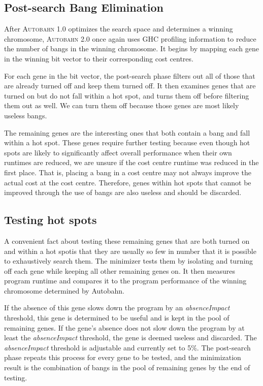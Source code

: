\documentclass[format=sigplan, review=true]{acmart}
\newcommand{\hotspot}[0]{hot spot}
\newcommand{\hotspots}[0]{hot spots}
\newcommand{\useless}[0]{useless}
\newcommand{\Ao}[0]{\textsc{Autobahn 1.0}}
\newcommand{\At}[0]{\textsc{Autobahn 2.0}}
\newcommand{\postopt}[0]{post-search}
\newcommand{\Postopt}[0]{Post-search}
\newcommand{\absim}[0]{\textit{absenceImpact}}
\begin{document}
\subsection{\Postopt{} Bang Elimination}

After \Ao{} optimizes the search space and determines a winning chromosome, \At{} once again uses GHC profiling information to reduce the number of bangs in the winning chromosome. It begins by mapping each gene in the winning bit vector to their corresponding cost centres. 

For each gene in the bit vector, the \postopt{} phase filters out all of those that are already turned off and keep them turned off. It then examines genes that are turned on but do not fall within a \hotspot{}, and turns them off before filtering them out as well. We can turn them off because those genes are most likely \useless{} bangs. 

The remaining genes are the interesting ones that both contain a bang and fall within a \hotspot{}. These genes require further testing because even though \hotspots{} are likely to significantly affect overall performance when their own runtimes are reduced, we are unsure if the cost centre runtime was reduced in the first place. That is, placing a bang in a cost centre may not always improve the actual cost at the cost centre. Therefore, genes within \hotspots{} that cannot be improved through the use of bangs are also \useless{} and should be discarded.

\subsection{Testing \hotspots{}}
 
A convenient fact about testing these remaining genes that are both turned on and within a \hotspot is that they are usually so few in number that it is possible to exhaustively search them. The minimizer tests them by isolating and turning off each gene while keeping all other remaining genes on. It then measures program runtime and compares it to the program performance of the winning chromosome determined by Autobahn. 

If the absence of this gene slows down the program by an \absim{} threshold, this gene is determined to be useful and is kept in the pool of remaining genes. If the gene's absence does not slow down the program by at least the \absim{} threshold, the gene is deemed \useless{} and discarded. The \absim{} threshold is adjustable and currently set to 5\%. The \postopt{} phase repeats this process for every gene to be tested, and the minimization result is the combination of bangs in the pool of remaining genes by the end of testing.
\end{document}
